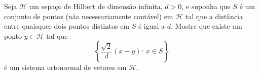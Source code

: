 Seja \( \mathcal{H}\) um espaço de Hilbert de dimensão infinita, \( d>0\), e suponha que \( S\) é um conjunto de pontos (não necessariamente contável) em \( \mathcal{H}\) tal que a distância entre quaisquer dois pontos distintos em \( S\) é igual a \( d\). Mostre que existe um ponto \( y\in\mathcal{H}\) tal que
\[ \left\{\frac{\sqrt{2}}{d}(x-y): \ x\in S\right\}\]
é um sistema ortonormal de vetores em \( \mathcal{H}\).
